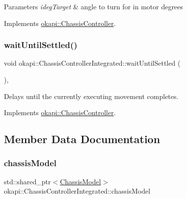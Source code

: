 \begin{DoxyParams}{Parameters}
{\em ideg\+Target} & angle to turn for in motor degrees \\
\hline
\end{DoxyParams}


Implements \mbox{\hyperlink{classokapi_1_1ChassisController_a35cadd99478629637b4bd3a5e709871a}{okapi\+::\+Chassis\+Controller}}.

\mbox{\label{classokapi_1_1ChassisControllerIntegrated_a2af994f5ddc68a48d7692fd16ca590c0}} 
\subsubsection{\texorpdfstring{waitUntilSettled()}{waitUntilSettled()}}
{\footnotesize\ttfamily void okapi\+::\+Chassis\+Controller\+Integrated\+::wait\+Until\+Settled (\begin{DoxyParamCaption}{ }\end{DoxyParamCaption})\hspace{0.3cm}{\ttfamily [override]}, {\ttfamily [virtual]}}

Delays until the currently executing movement completes. 

Implements \mbox{\hyperlink{classokapi_1_1ChassisController_a01ed4e0eb7332cc149228387bbf1e91c}{okapi\+::\+Chassis\+Controller}}.



\subsection{Member Data Documentation}
\mbox{\label{classokapi_1_1ChassisControllerIntegrated_a1bd4b6be267db5c317f4600c37044abb}} 
\subsubsection{\texorpdfstring{chassisModel}{chassisModel}}
{\footnotesize\ttfamily std\+::shared\+\_\+ptr$<$\mbox{\hyperlink{classokapi_1_1ChassisModel}{Chassis\+Model}}$>$ okapi\+::\+Chassis\+Controller\+Integrated\+::chassis\+Model\hspace{0.3cm}{\ttfamily [protected]}}

